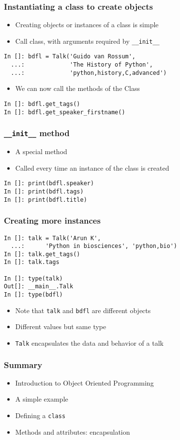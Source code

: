 \documentclass[14pt,compress,aspectratio=169]{beamer}
\begin{document}
\begin{frame}[fragile]
  \frametitle{Instantiating a class to create objects}
  \begin{itemize}
  \item Creating objects or instances of a class is simple
  \item Call class, with arguments required by \lstinline{__init__}
  \end{itemize}
  \begin{lstlisting}
In []: bdfl = Talk('Guido van Rossum',
  ...:             'The History of Python',
  ...:             'python,history,C,advanced')
  \end{lstlisting}
  \begin{itemize}
  \item We can now call the methods of the Class
  \end{itemize}
  \begin{lstlisting}
In []: bdfl.get_tags()
In []: bdfl.get_speaker_firstname()
  \end{lstlisting}
\end{frame}

\begin{frame}[fragile]
  \frametitle{\lstinline{__init__} method}
  \begin{itemize}
  \item A special method
  \item Called every time an instance of the class is created
  \end{itemize}
  \begin{lstlisting}
In []: print(bdfl.speaker)
In []: print(bdfl.tags)
In []: print(bdfl.title)
  \end{lstlisting}
\end{frame}

\begin{frame}[fragile]
  \frametitle{Creating more instances}
  \begin{lstlisting}
In []: talk = Talk('Arun K',
  ...:      'Python in biosciences', 'python,bio')
In []: talk.get_tags()
In []: talk.tags

In []: type(talk)
Out[]: __main__.Talk
In []: type(bdfl)
\end{lstlisting}
\begin{itemize}
\item Note that \lstinline{talk} and \lstinline{bdfl} are different objects
\item Different values but same type
\item \lstinline{Talk} \alert{encapsulates} the data and behavior of a talk
\end{itemize}
\end{frame}

\begin{frame}[fragile]
  \frametitle{Summary}
  \begin{itemize}
  \item Introduction to Object Oriented Programming
  \item A simple example
  \item Defining a \lstinline{class}
  \item Methods and attributes: encapsulation
  \end{itemize}
\end{frame}
\end{document}
